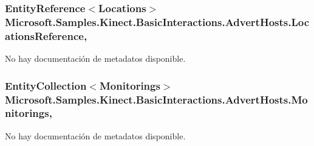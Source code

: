 \hypertarget{class_microsoft_1_1_samples_1_1_kinect_1_1_basic_interactions_1_1_advert_hosts_aad706c9d580fb02808a8a4574b16dc55}{
\subsubsection[{Locations\-Reference}]{\setlength{\rightskip}{0pt plus 5cm}Entity\-Reference$<${\bf Locations}$>$ Microsoft.\-Samples.\-Kinect.\-Basic\-Interactions.\-Advert\-Hosts.\-Locations\-Reference\hspace{0.3cm}{\ttfamily [get]}, {\ttfamily [set]}}}\label{class_microsoft_1_1_samples_1_1_kinect_1_1_basic_interactions_1_1_advert_hosts_aad706c9d580fb02808a8a4574b16dc55}


No hay documentación de metadatos disponible. 

\hypertarget{class_microsoft_1_1_samples_1_1_kinect_1_1_basic_interactions_1_1_advert_hosts_a721bcdfcb2bdbf22dcdb82a684d707b4}{
\subsubsection[{Monitorings}]{\setlength{\rightskip}{0pt plus 5cm}Entity\-Collection$<${\bf Monitorings}$>$ Microsoft.\-Samples.\-Kinect.\-Basic\-Interactions.\-Advert\-Hosts.\-Monitorings\hspace{0.3cm}{\ttfamily [get]}, {\ttfamily [set]}}}\label{class_microsoft_1_1_samples_1_1_kinect_1_1_basic_interactions_1_1_advert_hosts_a721bcdfcb2bdbf22dcdb82a684d707b4}


No hay documentación de metadatos disponible. 

